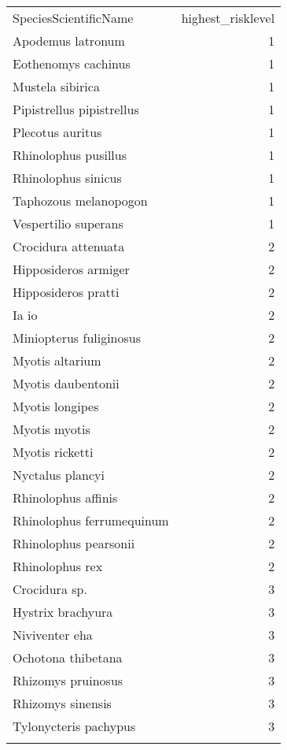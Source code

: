 \documentclass[11pt,article,oneside]{article}
\begin{document}
\begin{longtable}[c]{@{}lr@{}}
\toprule\addlinespace
SpeciesScientificName & highest\_risklevel
\\\addlinespace
\midrule\endhead
Apodemus latronum & 1
\\\addlinespace
Eothenomys cachinus & 1
\\\addlinespace
Mustela sibirica & 1
\\\addlinespace
Pipistrellus pipistrellus & 1
\\\addlinespace
Plecotus auritus & 1
\\\addlinespace
Rhinolophus pusillus & 1
\\\addlinespace
Rhinolophus sinicus & 1
\\\addlinespace
Taphozous melanopogon & 1
\\\addlinespace
Vespertilio superans & 1
\\\addlinespace
Crocidura attenuata & 2
\\\addlinespace
Hipposideros armiger & 2
\\\addlinespace
Hipposideros pratti & 2
\\\addlinespace
Ia io & 2
\\\addlinespace
Miniopterus fuliginosus & 2
\\\addlinespace
Myotis altarium & 2
\\\addlinespace
Myotis daubentonii & 2
\\\addlinespace
Myotis longipes & 2
\\\addlinespace
Myotis myotis & 2
\\\addlinespace
Myotis ricketti & 2
\\\addlinespace
Nyctalus plancyi & 2
\\\addlinespace
Rhinolophus affinis & 2
\\\addlinespace
Rhinolophus ferrumequinum & 2
\\\addlinespace
Rhinolophus pearsonii & 2
\\\addlinespace
Rhinolophus rex & 2
\\\addlinespace
Crocidura sp. & 3
\\\addlinespace
Hystrix brachyura & 3
\\\addlinespace
Niviventer eha & 3
\\\addlinespace
Ochotona thibetana & 3
\\\addlinespace
Rhizomys pruinosus & 3
\\\addlinespace
Rhizomys sinensis & 3
\\\addlinespace
Tylonycteris pachypus & 3
\\\addlinespace

\end{longtable}
\end{document}
